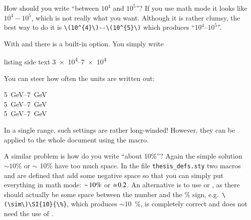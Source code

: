 How should you write \enquote{between \(10^{4}\) and \(10^{5}\)}?
If you use math mode it looks like \(10^{4} - 10^{5}\), which is not
really what you want.
Although it is rather clumsy, the best way to do
it is \verb+\(10^{4}\)--\(10^{5}\)+ which produces
\enquote{\(10^{4}\)--\(10^{5}\)}.

With  and  there is a built-in option.
You simply write
\begin{tcblisting}{listing side text}
\numrange{3e4}{7e4}
\end{tcblisting}
You can steer how often the units are written out:
\begin{tcblisting}{}
\SIrange[range-units=repeat, range-phrase=--]{5}{7}{\GeV}\\
\SIrange[range-units=single, range-phrase=--]{5}{7}{\GeV}\\
\SIrange[range-units=brackets, range-phrase=--]{5}{7}{\GeV}
\end{tcblisting}
In a single range, such settings are rather long-winded!
However, they can be applied to the whole
document using the  macro.

A similar problem is how do you write \enquote{about 10\%}?  Again the
simple solution \(\sim 10\%\) or \(\sim\) 10\% have too much space. In the
file \texttt{thesis\_defs.sty} two macros  and
 are defined that add some negative space so that you
can simply put everything in math mode: \(\sim\! 10\%\) or \(\simeq\! 0.2\).
An alternative is to use  or , as there
should actually be some space between the number and the \% sign,
e.g.\ \verb+\(\sim\)\SI{10}{\%}+, which produces \(\sim\)\SI{10}{\%}, is
completely correct and does not need the use of .

